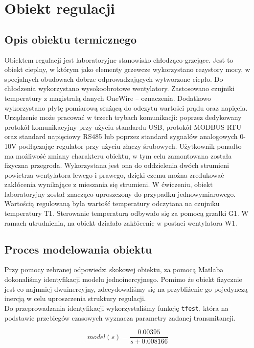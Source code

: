 \documentclass{mwrep}
\begin{document}
\chapter{Obiekt regulacji}
\label{ObiektRegulacji}

\section{Opis obiektu termicznego}
\label{ObiektTermiczny}
Obiektem regulacji jest laboratoryjne stanowisko chłodząco-grzejące. Jest to obiekt cieplny, 
w którym jako elementy grzewcze wykorzystano rezystory mocy, w specjalnych obudowach dobrze odprowadzających
wytworzone ciepło. Do chłodzenia wykorzystano wysokoobrotowe
wentylatory. Zastosowano czujniki temperatury z magistralą danych
OneWire – oznaczenia. Dodatkowo wykorzystano płytę pomiarową
służącą do odczytu wartości prądu oraz napięcia. Urządzenie może pracować w trzech trybach komunikacji: poprzez
dedykowany protokół komunikacyjny przy użyciu standardu USB,
protokół MODBUS RTU oraz standard napięciowy RS485 lub poprzez
standard sygnałów analogowych 0-10V podłączając regulator przy użyciu złączy
śrubowych. Użytkownik ponadto ma możliwość zmiany charakteru obiektu, w tym celu
zamontowana została fizyczna przegroda. Wykorzystana jest ona do oddzielenia dwóch
strumieni powietrza wentylatora lewego i prawego, dzięki czemu można zredukować
zakłócenia wynikające z mieszania się strumieni. W ćwiczeniu, obiekt laboratoryjny
został znacząco uproszczony do przypadku jednowymiarowego. Wartością regulowaną była
wartość temperatury odczytana na czujniku temperatury T1. Sterowanie temperaturą odbywało się 
za pomocą grzałki G1. W ramach utrudnienia, na obiekt działało zakłócenie w postaci wentylatora W1.


\section{Proces modelowania obiektu}
\label{ModelowanieObiektu}
Przy pomocy zebranej odpowiedzi skokowej obiektu, za pomocą Matlaba dokonaliśmy identyfikacji 
modelu jednoinercyjnego. Pomimo że obiekt fizycznie jest co najmniej dwuinercyjny, zdecydowaliśmy się na 
przybliżenie go pojedynczą inercją w celu uproszczenia struktury regulacji. \\
\indent Do przeprowadzania identyfikacji wykorzystaliśmy funkcję \texttt{tfest}, która na podstawie 
przebiegów czasowych wyznacza parametry zadanej transmitancji. 

\[model(s) = \frac{0.00395}{s + 0.008166}\]
\end{document}
